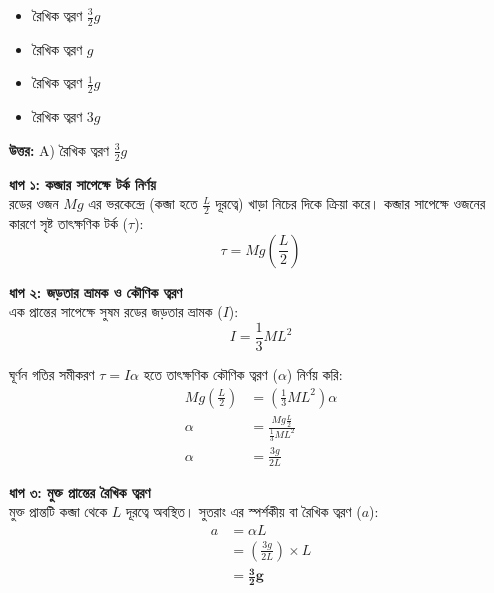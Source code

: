 \documentclass[12pt, a4paper]{article}
\begin{document}
\begin{itemize}[label={}, leftmargin=1cm, itemsep=0.5em]
    \item[\textbf{A)}] রৈখিক ত্বরণ $\frac{3}{2}g$
    \item[\textbf{B)}] রৈখিক ত্বরণ $g$
    \item[\textbf{C)}] রৈখিক ত্বরণ $\frac{1}{2}g$
    \item[\textbf{D)}] রৈখিক ত্বরণ $3g$
\end{itemize}

\vspace{0.5em}
\begin{tcolorbox}[answerbox]
    \textbf{\color{success} উত্তর:} A) রৈখিক ত্বরণ $\frac{3}{2}g$
\end{tcolorbox}
\vspace{1em}

\begin{tcolorbox}[solutionbox={সমাধান (Solution)}]
    \noindent
    \textbf{ধাপ ১: কব্জার সাপেক্ষে টর্ক নির্ণয়} \\
    রডের ওজন $Mg$ এর ভরকেন্দ্রে (কব্জা হতে $\frac{L}{2}$ দূরত্বে) খাড়া নিচের দিকে ক্রিয়া করে। কব্জার সাপেক্ষে ওজনের কারণে সৃষ্ট তাৎক্ষণিক টর্ক ($\tau$):
    \[ \tau = Mg \left(\frac{L}{2}\right) \]
    
    \vspace{0.5em}
    \noindent\textbf{ধাপ ২: জড়তার ভ্রামক ও কৌণিক ত্বরণ} \\
    এক প্রান্তের সাপেক্ষে সুষম রডের জড়তার ভ্রামক ($I$):
    \[ I = \frac{1}{3} M L^2 \]
    
    ঘূর্ণন গতির সমীকরণ $\tau = I \alpha$ হতে তাৎক্ষণিক কৌণিক ত্বরণ ($\alpha$) নির্ণয় করি:
    \begin{align*}
        Mg \left(\frac{L}{2}\right) &= \left(\frac{1}{3} M L^2\right) \alpha \\
        \alpha &= \frac{Mg \frac{L}{2}}{\frac{1}{3} M L^2} \\
        \alpha &= \frac{3g}{2L}
    \end{align*}
    
    \vspace{0.5em}
    \noindent\textbf{ধাপ ৩: মুক্ত প্রান্তের রৈখিক ত্বরণ} \\
    মুক্ত প্রান্তটি কব্জা থেকে $L$ দূরত্বে অবস্থিত। সুতরাং এর স্পর্শকীয় বা রৈখিক ত্বরণ ($a$):
    \begin{align*}
        a &= \alpha L \\
          &= \left(\frac{3g}{2L}\right) \times L \\
          &= \mathbf{\frac{3}{2}g}
    \end{align*}
\end{tcolorbox}
\end{document}
